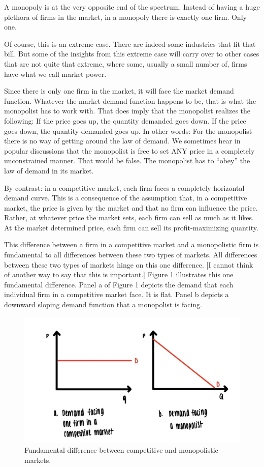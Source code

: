 \documentclass[
]{book}
\begin{document}
A monopoly is at the very opposite end of the spectrum. Instead of having a huge plethora of firms in the market, in a monopoly there is exactly one firm. Only one.

Of course, this is an extreme case. There are indeed some industries that fit that bill. But some of the insights from this extreme case will carry over to other cases that are not quite that extreme, where some, usually a small number of, firms have what we call market power.

Since there is only one firm in the market, it will face the market demand function. Whatever the market demand function happens to be, that is what the monopolist has to work with. That does imply that the monopolist realizes the following: If the price goes up, the quantity demanded goes down. If the price goes down, the quantity demanded goes up. In other words: For the monopolist there is no way of getting around the law of demand. We sometimes hear in popular discussions that the monopolist is free to set ANY price in a completely unconstrained manner. That would be false. The monopolist has to ``obey'' the law of demand in its market.

By contrast: in a competitive market, each firm faces a completely horizontal demand curve. This is a consequence of the assumption that, in a competitive market, the price is given by the market and that no firm can influence the price. Rather, at whatever price the market sets, each firm can sell as much as it likes. At the market determined price, each firm can sell its profit-maximizing quantity.

This difference between a firm in a competitive market and a monopolistic firm is fundamental to all differences between these two types of markets. All differences between these two types of markets hinge on this one difference. {[}I cannot think of another way to say that this is important.{]} Figure 1 illustrates this one fundamental difference. Panel a of Figure 1 depicts the demand that each individual firm in a competitive market face. It is flat. Panel b depicts a downward sloping demand function that a monopolist is facing.

\begin{figure}

{\centering \includegraphics[width=0.75\linewidth]{img/ch6/fig1} 

}

\caption{Fundamental difference between competitive and monopolistic markets.}\label{fig:fig601}
\end{figure}
\end{document}
